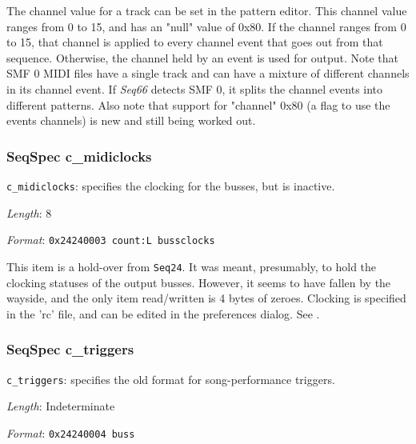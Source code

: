    The channel value for a track can be set in the pattern editor.
   This channel value ranges from 0 to 15, and has an "null" value of 0x80.  If
   the channel ranges from 0 to 15, that channel is applied to every channel
   event that goes out from that sequence.  Otherwise, the channel held by an
   event is used for output.  Note that SMF 0 MIDI files have a single track
   and can have a mixture of different channels in its channel event.
   If \textsl{Seq66} detects SMF 0, it splits the channel events into different
   patterns.
   Also note that support for "channel" 0x80 (a flag to use the events
   channels) is new and still being worked out.

\subsubsection{SeqSpec c\_midiclocks}
\label{subsubsec:midi_format_track_seqspec_midiclocks}


   \begin{description}
      \item \texttt{c\_midiclocks}: specifies the clocking for the busses, but is inactive.
      \item \textsl{Length}: 8
      \item \textsl{Format}: \texttt{0x24240003 count:L bussclocks}
   \end{description}

   This item is a hold-over from \texttt{Seq24}.  It was meant, presumably, to
   hold the clocking statuses of the output busses.  However, it seems to have
   fallen by the wayside, and the only item read/written is 4 bytes of zeroes.
   Clocking is specified in the 'rc' file, and can be edited in the preferences
   dialog.
   See .

\subsubsection{SeqSpec c\_triggers}
\label{subsubsec:midi_format_track_seqspec_triggers}


   \begin{description}
      \item \texttt{c\_triggers}:
         specifies the old format for song-performance triggers.
      \item \textsl{Length}: Indeterminate
      \item \textsl{Format}: \texttt{0x24240004 buss}
   \end{description}

